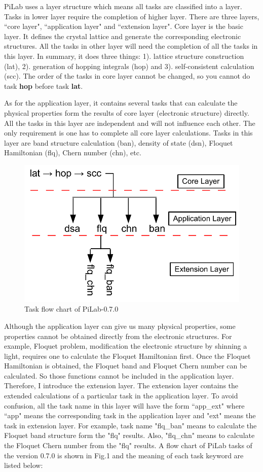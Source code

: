 \documentclass[10pt,a4paper]{article}
\begin{document}
PiLab uses a layer structure which means all tasks are classified into a layer. Tasks in lower layer require the completion of higher layer. There are three layers, ``core layer", ``application layer" and ``extension layer". Core layer is the basic layer. It defines the crystal lattice and generate the corresponding electronic structures. All the tasks in other layer will need the completion of all the tasks in this layer. In summary, it does three things: 1). lattice structure construction (lat), 2). generation of hopping integrals (hop) and 3). self-consistent calculation (scc). The order of the tasks in core layer cannot be changed, so you cannot do task \textbf{hop} before task \textbf{lat}. 

As for the application layer, it contains several tasks that can calculate the physical properties form the results of core layer (electronic structure) directly. All the tasks in this layer are independent and will not influence each other. The only requirement is one has to complete all core layer calculations. Tasks in this layer are band structure calculation (ban), density of state (dsn), Floquet Hamiltonian (flq), Chern number (chn), etc. 
\begin{figure}[tbp]
\centering
\includegraphics[width=0.8\columnwidth]{flow_chart.pdf}
\caption{Task flow chart of PiLab-0.7.0}
\end{figure}

Although the application layer can give us many physical properties, some properties cannot be obtained directly from the electronic structures. For example, Floquet problem, modification the electronic structure by shinning a light, requires one to calculate the Floquet Hamiltonian first. Once the Floquet Hamiltonian is obtained, the Floquet band and Floquet Chern number can be calculated. So those functions cannot be included in the application layer. Therefore, I introduce the extension layer. The extension layer contains the extended calculations of a particular task in the application layer. To avoid confusion, all the task name in this layer will have the form ``app\_ext" where ``app" means the corresponding task in the application layer and "ext" means the task in extension layer. For example, task name "flq\_ban" means to calculate the Floquet band structure form the "flq" results. Also, "flq\_chn" means to calculate the Floquet Chern number from the "flq" results. A flow chart of PiLab tasks of the version 0.7.0 is shown in Fig.1 and the meaning of each task keyword are listed below:\\
\end{document}
